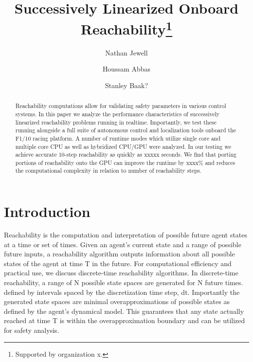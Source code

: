 \documentclass[runningheads]{llncs}
\begin{document}
%
\title{Successively Linearized Onboard Reachability\thanks{Supported by organization x.}}
%
%
\author{Nathan Jewell \and
Houssam Abbas \and
Stanley Baak?}
%
%
%
\maketitle              %
%
\begin{abstract}
Reachability computations allow for validating safety parameters in various control systems. In this paper we analyze the performance characteristics of successively linearized reachability problems running in realtime. Importantly, we test these running alongside a full suite of autonomous control and localization tools onboard the F1/10 racing platform. A number of runtime modes which utilize single core and multiple core CPU as well as hybridized CPU/GPU were analyzed. In our testing we achieve accurate 10-step reachability as quickly as xxxxx seconds. We find that porting portions of reachability onto the GPU can improve the runtime by xxxx\% and reduces the computational complexity in relation to number of reachability steps.

\end{abstract}
%
%
%
\section{Introduction}
Reachability is the computation and interpretation of possible future agent states at a time or set of times. Given an agent's current state and a range of possible future inputs, a reachability algorithm outputs information about all possible states of the agent at time T in the future. For computational efficiency and practical use, we discuss discrete-time reachability algorithms. In discrete-time reachability, a range of N possible state spaces are generated for N future times. defined by intervals spaced by the discretization time step, dt. Importantly the generated state spaces are minimal overapproximations of possible states as defined by the agent’s dynamical model. This guarantees that any state actually reached at time T is within the overapproximation boundary and can be utilized for safety analysis.
\end{document}
